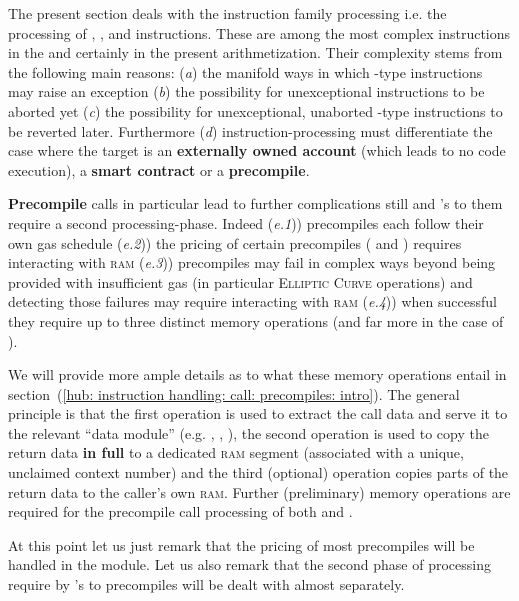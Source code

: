 The present section deals with the  instruction family processing i.e. the processing of
, ,  and  instructions.
These are among the most complex instructions in the \evm{} and certainly in the present arithmetization.
Their complexity stems from the following main reasons:
(\emph{a}) the manifold ways in which -type instructions may raise an exception
(\emph{b}) the possibility for unexceptional instructions to be aborted yet
(\emph{c}) the possibility for unexceptional, unaborted -type instructions to be reverted later.
Furthermore
(\emph{d}) instruction-processing must differentiate the case where the target is an \textbf{externally owned account} (which leads to no code execution), a \textbf{smart contract} or a \textbf{precompile}.

\textbf{Precompile} calls in particular lead to further complications still and 's to them require a second processing-phase.
Indeed
(\emph{e.1})) precompiles each follow their own gas schedule
(\emph{e.2})) the pricing of certain precompiles ( and ) requires interacting with \textsc{ram}
(\emph{e.3})) precompiles may fail in complex ways beyond being provided with insufficient gas (in particular \textsc{Elliptic Curve} operations) and detecting those failures may require interacting with \textsc{ram}
(\emph{e.4})) when successful they require up to three distinct memory operations (and far more in the case of ).

We will provide more ample details as to what these memory operations entail in section~(\ref{hub: instruction handling: call: precompiles: intro}).
The general principle is that
the first operation is used to extract the call data and serve it to the relevant ``data module'' (e.g. \shakiraMod{}, \ecDataMod{}, \blkMdxMod{}),
the second operation is used to copy the return data \textbf{in full} to a dedicated \textsc{ram} segment (associated with a unique, unclaimed context number) and
the third (optional) operation copies parts of the return data to the caller's own \textsc{ram}.
Further (preliminary) memory operations are required for the precompile call processing of both  and .

At this point let us just remark that the pricing of most precompiles will be handled in the \oobMod{} module. Let us also remark that the second phase of processing require by 's to precompiles will be dealt with almost separately. 
